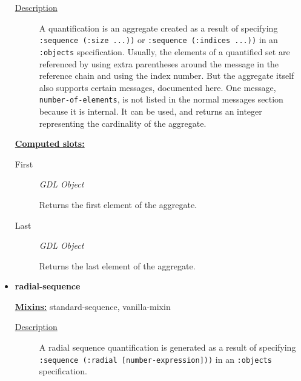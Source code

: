 \documentclass [11pt]{book}
\begin{document}
\begin{itemize}
\begin{description}
\item [
\underline{Description}]


A quantification is an aggregate created as a result of specifying \texttt{:sequence (:size ...))} or
\texttt{:sequence (:indices ...))} in an \texttt{:objects} specification. Usually, the elements of a quantified set are referenced by using
extra parentheses around the message in the reference chain and using the index number. But the aggregate itself also supports certain
messages, documented here. One message, \texttt{number-of-elements}, is not listed in the normal messages section because it is 
internal. It can be used, and returns an integer representing the cardinality of the aggregate.



\end{description}








\textbf{
\underline{Computed slots:}}

\begin{description}

\item [First]
\emph{GDL Object}

 Returns the first element of the aggregate.




\item [Last]
\emph{GDL Object}

 Returns the last element of the aggregate.




\end{description}







\item {}
\label{prim:radial-sequence}
\textbf{radial-sequence}


\textbf{
\underline{Mixins:}} standard-sequence, vanilla-mixin





\begin{description}

\item [
\underline{Description}]


A radial sequence quantification is generated as a result of specifying 
\texttt{:sequence (:radial [number-expression]))} in an \texttt{:objects} specification.




\end{description}
\end{itemize}
\end{document}
